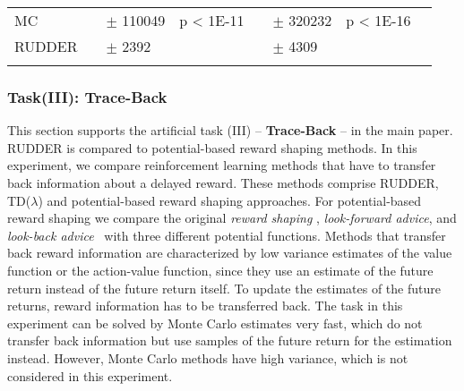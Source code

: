 \documentclass{article}
\begin{document}
\begin{appendices}
\begin{landscape}
\begin{table}[htp]
\begin{flushleft}
\begin{tabular}{*{1}{>{\raggedright}p{14em}}*{1}{>{\columncolor{mColor1}\raggedleft}p{4em}}*{1}{>{\columncolor{mColor1}\raggedleft}p{5em}}*{1}{>{\columncolor{mColor1}\raggedright}p{5em}}*{1}{>{\raggedleft}p{4em}}*{1}{>{\raggedleft}p{5em}}*{1}{>{\raggedright}p{5em}}*{1}{>{\raggedright}p{0.01em}}}
\toprule[1pt]
\addlinespace[2pt]
{\bf Method} &\multicolumn{3}{c}{\bf Delay 100} &\multicolumn{3}{c}{\bf Delay 500} &\\
\toprule[1pt]
MC & 119568 & {\small $\pm$ 110049} & {\small p < 1E-11} & 345533 & {\small $\pm$ 320232} & {\small p < 1E-16} &  \\
RUDDER & 4147 & {\small $\pm$ 2392} &  & 5769 & {\small $\pm$ 4309} &  &  \\
\addlinespace[1pt]
\end{tabular}
\end{flushleft}
\end{table}

\end{landscape}


\newpage








\subsubsection{Task(III): Trace-Back}
This section supports the artificial task (III) -- {\bf Trace-Back} -- in the main paper.
RUDDER is compared to potential-based reward shaping methods.
In this experiment, we compare reinforcement learning methods that
have to transfer back information about a delayed reward.
These methods comprise RUDDER, TD($\lambda$) and potential-based reward shaping approaches.
For potential-based reward shaping we compare the original 
{\em reward shaping} \cite{Ng:99}, {\em look-forward advice}, 
and {\em look-back advice}~\cite{Wiewiora:03}
with three different potential functions.
Methods that transfer back reward information
are characterized by low variance estimates
of the value function or the action-value function, 
since they use an estimate of the future return instead of the
future return itself.
To update the estimates of the future returns, 
reward information has to be transferred back.
The task in this experiment can be solved by Monte Carlo
estimates very fast, which do not transfer back information but use samples of 
the future return for the estimation instead. 
However, Monte Carlo methods have high variance, which is
not considered in this experiment. 

\end{appendices}
\end{document}
